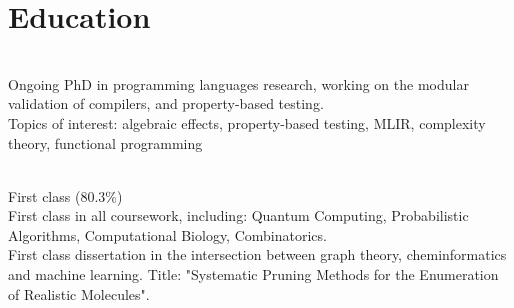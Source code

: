 \documentclass[]{deedy-resume-openfont}
\begin{document}
    
%
%

%
%
%

%
%
\section{Education}
\raggedright

\hfill {}\\
Ongoing PhD in programming languages research, working on the modular validation of compilers, and property-based testing. \\
Topics of interest: algebraic effects, property-based testing, MLIR, complexity theory, functional programming\\
\sectionsep 

\hfill {}\\
First class (80.3\%) \\
First class in all coursework, including: Quantum Computing, Probabilistic Algorithms, Computational Biology, Combinatorics. \\
First class dissertation in the intersection between graph theory, cheminformatics and machine learning. Title: "Systematic Pruning Methods for the Enumeration of Realistic Molecules".\\
\sectionsep 
\end{document}
